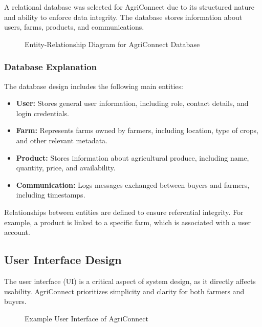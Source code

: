 \documentclass[12pt,a4paper]{article}
\begin{document}
A relational database was selected for AgriConnect due to its structured nature and ability to enforce data integrity. The database stores information about users, farms, products, and communications.

\begin{figure}[H]
\centering
{}
\caption{Entity-Relationship Diagram for AgriConnect Database}
\end{figure}

\subsubsection{Database Explanation}

The database design includes the following main entities:

\begin{itemize}
    \item \textbf{User:} Stores general user information, including role, contact details, and login credentials.
    \item \textbf{Farm:} Represents farms owned by farmers, including location, type of crops, and other relevant metadata.
    \item \textbf{Product:} Stores information about agricultural produce, including name, quantity, price, and availability.
    \item \textbf{Communication:} Logs messages exchanged between buyers and farmers, including timestamps.
\end{itemize}

Relationships between entities are defined to ensure referential integrity. For example, a product is linked to a specific farm, which is associated with a user account.

\subsection{User Interface Design}

The user interface (UI) is a critical aspect of system design, as it directly affects usability. AgriConnect prioritizes simplicity and clarity for both farmers and buyers.

\begin{figure}[H]
\centering
{}
\caption{Example User Interface of AgriConnect}
\end{figure}
\end{document}
